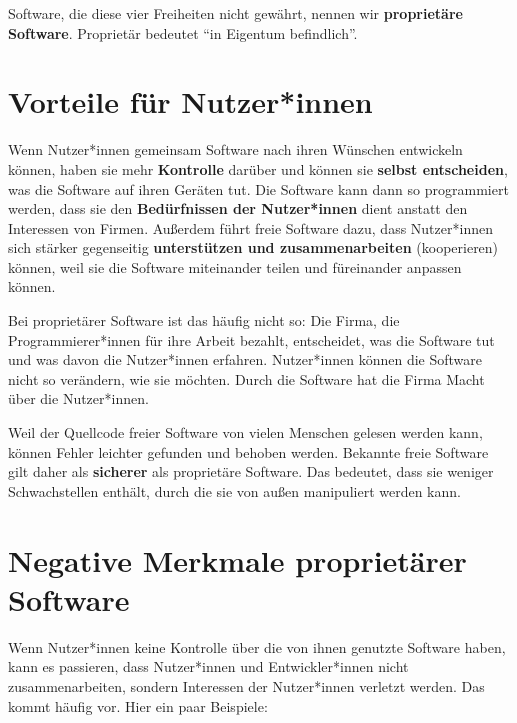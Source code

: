 \documentclass[a5paper,12pt]{scrartcl}
\begin{document}
Software, die diese vier Freiheiten nicht gewährt, nennen wir
\textbf{proprietäre Software}. Proprietär bedeutet "`in Eigentum
befindlich"'.


\section{Vorteile für Nutzer*innen}

Wenn Nutzer*innen gemeinsam Software nach ihren Wünschen entwickeln
können, haben sie mehr \textbf{Kontrolle} darüber und können sie
\textbf{selbst entscheiden}, was die Software auf ihren Geräten
tut. Die Software kann dann so programmiert werden, dass sie den
\textbf{Bedürfnissen der Nutzer*innen} dient anstatt den Interessen
von Firmen. Außerdem führt freie Software dazu, dass Nutzer*innen sich
stärker gegenseitig \textbf{unterstützen und zusammenarbeiten}
(kooperieren) können, weil sie die Software miteinander teilen und
füreinander anpassen können.

Bei proprietärer Software ist das häufig nicht so: Die Firma, die
Programmierer*innen für ihre Arbeit bezahlt, entscheidet, was die
Software tut und was davon die Nutzer*innen erfahren. Nutzer*innen
können die Software nicht so verändern, wie sie möchten. Durch die
Software hat die Firma Macht über die Nutzer*innen.

Weil der Quellcode freier Software von vielen Menschen gelesen werden
kann, können Fehler leichter gefunden und behoben werden. Bekannte
freie Software gilt daher als \textbf{sicherer} als proprietäre
Software. Das bedeutet, dass sie weniger Schwachstellen enthält, durch
die sie von außen manipuliert werden kann.


\section{Negative Merkmale proprietärer Software}

Wenn Nutzer*innen keine Kontrolle über die von ihnen genutzte Software
haben, kann es passieren, dass Nutzer*innen und Entwickler*innen nicht
zusammenarbeiten, sondern Interessen der Nutzer*innen verletzt
werden. Das kommt häufig vor. Hier ein paar Beispiele:
\end{document}
